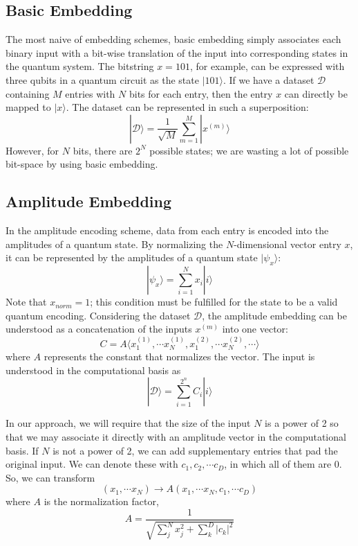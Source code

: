\documentclass[12pt]{article}
\begin{document}
    \subsection{Basic Embedding}
        The most naive of embedding schemes, basic embedding simply associates each binary input with a bit-wise translation 
        of the input into corresponding states in the quantum system. The bitstring $x=101$, for example, can be expressed with 
        three qubits in a quantum circuit as the state $|101\rangle$. If we have a dataset $\mathcal{D}$ containing $M$ entries with $N$ bits for each entry, then the 
        entry $x$ can directly be mapped to $|x\rangle$. 
        The dataset can be represented in such a superposition:
        \[|\mathcal{D}\rangle = \frac{1}{\sqrt{M}} \sum^{M}_{m=1} |x^{(m)}\rangle\]
        However, for $N$ bits, there are $2^N$ possible states; we are wasting a lot of possible bit-space by using basic embedding.

    \subsection{Amplitude Embedding}
        In the amplitude encoding scheme, data from each entry is encoded into the amplitudes of a quantum state. 
        By normalizing the $N$-dimensional vector entry $x$, it can be represented by the amplitudes of a quantum state $|\psi_x\rangle$:
        \[|\psi_x\rangle = \sum_{i=1}^N x_i |i\rangle\]
        Note that $x_{norm} = 1$; this condition must be fulfilled for the state to be a valid quantum encoding.
        Considering the dataset $\mathcal{D}$, the amplitude embedding can be understood as a concatenation of the inputs $x^{(m)}$ into one vector:
        \[C = A\langle x_1^{(1)}, \cdots x_N^{(1)}, x_1^{(2)}, \cdots x_N^{(2)}, \cdots \rangle\]
        where $A$ represents the constant that normalizes the vector. The input is understood in the computational basis as 
        \[|\mathcal{D}\rangle = \sum_{i=1}^{2^n}C_i|i\rangle\]

        In our approach, we will require that the size of the input $N$ is a power of 2 so that we may associate it directly with an 
        amplitude vector in the computational basis. If $N$ is not a power of 2, we can add supplementary entries that pad the original input. We 
        can denote these with $c_1, c_2, \cdots c_D$, in which all of them are 0. So, we can transform 
        \[(x_1, \cdots x_N) \to A(x_1, \cdots x_N, c_1, \cdots c_D)\]
        where $A$ is the normalization factor,
        \[A = \frac{1}{\sqrt{\sum_j^N x^2_j + \sum_k^D |c_k|^2}}\]
\end{document}

